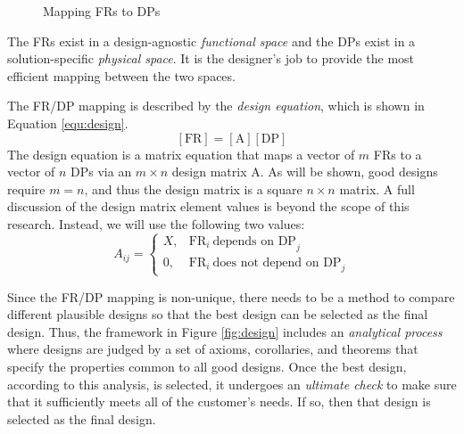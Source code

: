 \begin{figure}[h]
  \label{fig:mapping}
  \begin{center}
  \end{center}
  \caption{Mapping FRs to DPs}
\end{figure}

The FRs exist in a design-agnostic \emph{functional space} and the DPs exist in a solution-specific
\emph{physical space}.  It is the designer's job to provide the most efficient mapping between the two spaces.

The FR/DP mapping is described by the \emph{design equation}, which is shown in Equation \ref{equ:design}.
\begin{equation}
  \label{equ:design}
  [\text{FR}]=[\text{A}][\text{DP}]
\end{equation}
The design equation is a matrix equation that maps a vector of \(m\) FRs to a vector of \(n\) DPs via an \(m\times
n\) design matrix A.  As will be shown, good designs require \(m=n\), and thus the design matrix is a square
\(n\times n\) matrix.  A full discussion of the design matrix element values is beyond the scope of this research.
Instead, we will use the following two values:
\[A_{ij}=\begin{cases}
X, & \text{FR}_i\ \text{depends on DP}_j \\
0, & \text{FR}_i\ \text{does not depend on DP}_j
\end{cases}\]

Since the FR/DP mapping is non-unique, there needs to be a method to compare different plausible designs so that
the best design can be selected as the final design.  Thus, the framework in Figure \ref{fig:design} includes an
\emph{analytical process} where designs are judged by a set of axioms, corollaries, and theorems that specify the
properties common to all good designs.  Once the best design, according to this analysis, is selected, it undergoes
an \emph{ultimate check} to make sure that it sufficiently meets all of the customer's needs.  If so, then that
design is selected as the final design.

